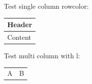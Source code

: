 ﻿\documentclass[10pt]{article}
\begin{document}
Test single column rowcolor:
\begin{tabular}{|p{5cm}|}
\hline
\rowcolor{navy}\color{white} Header \\
\hline
Content \\
\hline
\end{tabular}

Test multi column with l:
\begin{tabular}{|p{3cm}|p{3cm}|}
\hline
\rowcolor{navy}\multicolumn{2}{|l|}{\color{white} Header} \\
\hline
A & B \\
\hline
\end{tabular}
\end{document}
